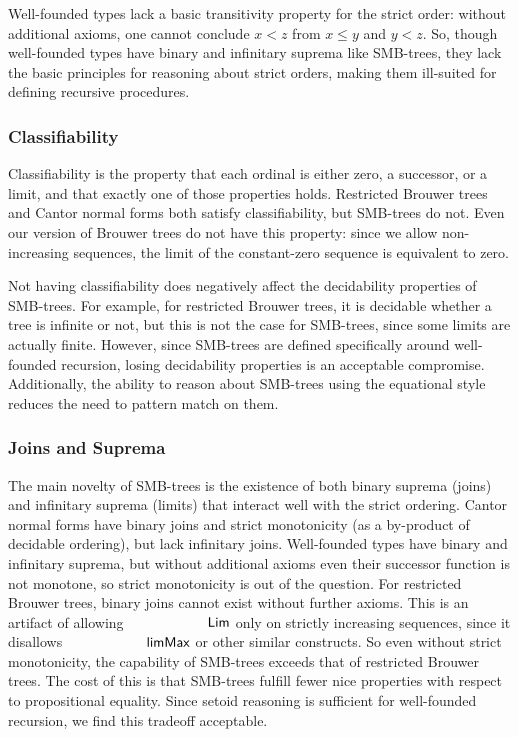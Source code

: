 Well-founded types lack a basic transitivity property for the strict order:
without additional axioms, one cannot conclude $x < z$ from $x \le y$ and $y < z$.
So, though well-founded types have binary and infinitary suprema like SMB-trees,
they lack the basic principles for reasoning about strict orders, making them ill-suited
for defining recursive procedures.

\subsubsection{Classifiability}
Classifiability is the property that each ordinal is either zero, a successor,
or a limit, and that exactly one of those properties holds.
Restricted Brouwer trees and Cantor normal forms both satisfy classifiability,
but SMB-trees do not. Even our version of Brouwer trees do not have this property:
since we allow non-increasing sequences, the limit of the constant-zero sequence
is equivalent to zero.

Not having classifiability does negatively affect the decidability properties of SMB-trees.
For example, for restricted Brouwer trees, it is decidable whether a tree is
infinite or not, but this is not the case for SMB-trees, since some limits are
actually finite. However, since SMB-trees are defined specifically around
well-founded recursion, losing decidability properties is an acceptable
compromise. Additionally, the ability to reason about SMB-trees using the
equational style reduces the need to pattern match on them.

\subsubsection{Joins and Suprema}

The main novelty of SMB-trees is the existence of both binary suprema (joins) and infinitary suprema (limits)
that interact well with the strict ordering.
Cantor normal forms have binary joins and strict monotonicity (as a by-product of decidable ordering),
but lack infinitary joins.
Well-founded types have binary and infinitary suprema,
but without additional axioms even their successor function is not monotone,
so strict monotonicity is out of the question.
For restricted Brouwer trees,
binary joins cannot exist without further axioms. This is an artifact of
allowing $\Lim$ only on strictly increasing sequences, since it disallows
$\limMax$ or other similar constructs.
So even without strict monotonicity, the capability of SMB-trees exceeds that of
restricted Brouwer trees. The cost of this is that SMB-trees fulfill fewer nice properties
with respect to propositional equality. Since setoid reasoning is sufficient for well-founded recursion,
we find this tradeoff acceptable.


